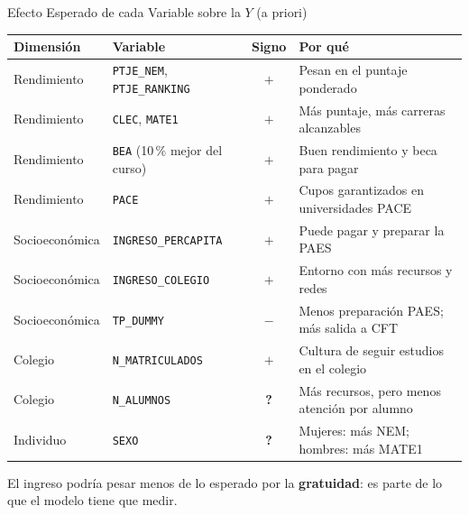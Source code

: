 \documentclass[10pt, aspectratio=169, xcolor=table]{beamer}
\begin{document}
\begin{frame}{Efecto Esperado de cada Variable sobre la $Y$ (a priori)}
  \begin{table}
    \centering
    \footnotesize
    \begin{tabular}{llcl}
      \toprule
      \textbf{\textcolor{USACHNavy}{Dimensión}} & \textbf{\textcolor{USACHNavy}{Variable}} & \textbf{\textcolor{USACHNavy}{Signo}} & \textbf{\textcolor{USACHNavy}{Por qué}} \\
      \midrule
      Rendimiento   & \texttt{PTJE\_NEM}, \texttt{PTJE\_RANKING} & \textcolor{USACHTeal}{\textbf{$+$}} & Pesan en el puntaje ponderado \\
      Rendimiento   & \texttt{CLEC}, \texttt{MATE1}               & \textcolor{USACHTeal}{\textbf{$+$}} & Más puntaje, más carreras alcanzables \\
      Rendimiento   & \texttt{BEA} (10\,\% mejor del curso)       & \textcolor{USACHTeal}{\textbf{$+$}} & Buen rendimiento y beca para pagar \\
      Rendimiento   & \texttt{PACE}                               & \textcolor{USACHTeal}{\textbf{$+$}} & Cupos garantizados en universidades PACE \\
      Socioeconómica & \texttt{INGRESO\_PERCAPITA}                & \textcolor{USACHTeal}{\textbf{$+$}} & Puede pagar y preparar la PAES \\
      Socioeconómica & \texttt{INGRESO\_COLEGIO}                  & \textcolor{USACHTeal}{\textbf{$+$}} & Entorno con más recursos y redes \\
      Socioeconómica & \texttt{TP\_DUMMY}                         & \textcolor{USACHOrange}{\textbf{$-$}} & Menos preparación PAES; más salida a CFT \\
      Colegio       & \texttt{N\_MATRICULADOS}                    & \textcolor{USACHTeal}{\textbf{$+$}} & Cultura de seguir estudios en el colegio \\
      Colegio       & \texttt{N\_ALUMNOS}                         & \textbf{?} & Más recursos, pero menos atención por alumno \\
      Individuo     & \texttt{SEXO}                               & \textbf{?} & Mujeres: más NEM; hombres: más MATE1 \\
      \bottomrule
    \end{tabular}
  \end{table}

  \vspace{-0.1cm}
  \begin{center}
    \footnotesize
    El ingreso podría pesar menos de lo esperado por la \textbf{\textcolor{USACHOrange}{gratuidad}}: es parte de lo que el modelo tiene que medir.
  \end{center}
\end{frame}
\end{document}
